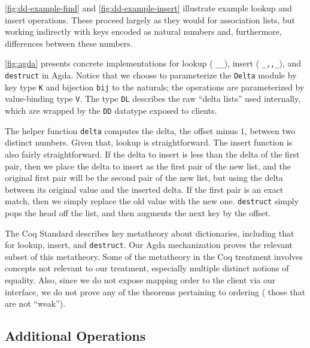 

\autoref{fig:dd-example-find} and \autoref{fig:dd-example-insert} illustrate example lookup and insert operations.
%
These proceed largely as they would for association lists, but working indirectly with keys encoded as natural numbers and, furthermore, differences between these numbers.

\autoref{fig:agda} presents concrete implementations for lookup (\ie{} \texttt{\_\altLAng\_\altRAng}), insert (\ie{} \texttt{\_,,\_}), and \texttt{destruct} in Agda.
%
Notice that we choose to parameterize the \texttt{Delta} module by key type \verb+K+ and bijection \verb+bij+ to the naturals; the operations are parameterized by value-binding type \verb+V+.
%
%
The type \verb+DL+ describes the raw ``delta lists'' used internally, which are wrapped by the \verb+DD+ datatype exposed to clients.

The helper function \verb+delta+ computes the delta, \ie{} the offset minus $1$, between two distinct numbers.
%
Given that, lookup is straightforward. The insert function is also fairly straightforward.
%
If the delta to insert is less than the delta of the first pair, then we place the delta to insert as the first pair of the new list, and
%
the original first pair will be the second pair of the new list, but using the delta between its original value and the inserted delta.
%
If the first pair is an exact match, then we simply replace the old value with the new one.
%
\verb+destruct+ simply pops the head off the list, and then augments the next key by the offset.

%
The Coq Standard \citet[Facts about weak maps]{FMapFacts} describes key metatheory about dictionaries, including that for lookup, insert, and \verb+destruct+.
%
Our Agda mechanization proves the relevant subset of this metatheory. Some of the metatheory in the Coq treatment involves concepts not relevant to our treatment,
%
especially multiple distinct notions of equality. Also, since we do not expose mapping order to the client via our interface,
%
we do not prove any of the theorems pertaining to ordering (\ie{} those that are not ``weak'').


\subsection{Additional Operations}

